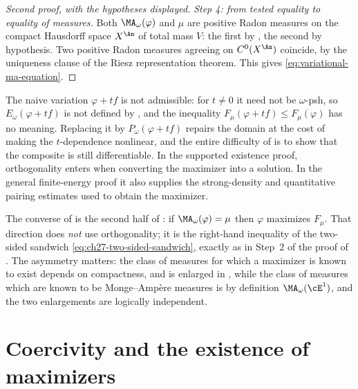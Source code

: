 \begin{proof}[Second proof, with the hypotheses displayed]
\emph{Step 4: from tested equality to equality of measures.}  Both
$\MA_\omega(\varphi)$ and $\mu$ are positive Radon measures on the
compact Hausdorff space $X^{\An}$ of total mass $V$: the first by
, the second by hypothesis.  Two positive
Radon measures agreeing on $C^0(X^{\An})$ coincide, by the uniqueness
clause  of the Riesz representation theorem.
This gives \eqref{eq:variational-ma-equation}.
\end{proof}

\begin{remark}
\label{rem:ch28-envelope-essential}
The naive variation $\varphi+tf$ is not admissible: for $t\neq0$ it need
not be $\omega$-psh, so $E_\omega(\varphi+tf)$ is not defined by
, and the inequality $F_\mu(\varphi+tf)\leq
F_\mu(\varphi)$ has no meaning.  Replacing it by $P_\omega(\varphi+tf)$
repairs the domain at the cost of making the $t$-dependence nonlinear, and
the entire difficulty of  is to show that
the composite is still differentiable.  In the supported existence proof, orthogonality enters when converting
the maximizer into a solution.  In the general finite-energy proof it
also supplies the strong-density and quantitative pairing estimates
used to obtain the maximizer.
\end{remark}

\begin{remark}
\label{rem:ch28-converse-direction}
The converse of  is the second half
of : if $\MA_\omega(\varphi)=\mu$ then
$\varphi$ maximizes $F_\mu$.  That direction does \emph{not} use
orthogonality; it is the right-hand inequality of the two-sided sandwich
\eqref{eq:ch27-two-sided-sandwich}, exactly as in Step~2 of the proof of
.  The asymmetry matters: the class of
measures for which a maximizer is known to exist depends on compactness, and
is enlarged in , while the class of measures which
are known to be Monge--Amp\`ere measures is by definition
$\MA_\omega(\cE^1)$, and the two enlargements are logically independent.
\end{remark}

\section{Coercivity and the existence of maximizers}
\label{sec:ch28-coercivity}

